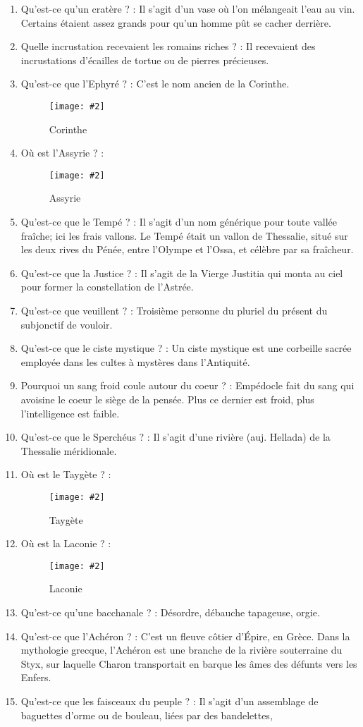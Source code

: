 \documentclass[a4paper, 11pt, hidelinks]{article}
\newcommand{\img}[4]{\begin{figure}[!ht]
    \centering
    \texttt{[image: \#2]}
    \caption{#3}
    \label{#4}
    \end{figure} }
\begin{document}
\begin{enumerate}
      \item Qu'est-ce qu'un cratère ? : Il s'agit d'un vase où l'on mélangeait l'eau au vin. Certains étaient assez grands pour
            qu'un homme pût se cacher derrière.
      \item Quelle incrustation recevaient les romains riches ? : Il recevaient des incrustations d'écailles de tortue ou de pierres précieuses.
      \item Qu'est-ce que l'Ephyré ? : C'est le nom ancien de la Corinthe.
            \img{0.3}{Corinthe.png}{Corinthe}{101}
      \item Où est l'Assyrie ? :
            \img{0.3}{Assyrie.jpg}{Assyrie}{102}
      \item Qu'est-ce que le Tempé ? : Il s'agit d'un nom générique pour toute vallée fraîche; ici les frais vallons. Le Tempé était un vallon de Thessalie, situé
            sur les deux rives du Pénée, entre l'Olympe et l'Ossa, et célèbre par sa fraîcheur.
      \item Qu'est-ce que la Justice ? : Il s'agit de la Vierge Justitia qui monta au ciel pour former la constellation de l'Astrée.
      \item Qu'est-ce que veuillent ? : Troisième personne du pluriel du présent du subjonctif de vouloir.
      \item Qu'est-ce que le ciste mystique ? : Un ciste mystique est une corbeille sacrée employée dans les cultes à mystères dans l'Antiquité.
      \item Pourquoi un sang froid coule autour du coeur ? : Empédocle fait du sang qui avoisine le coeur le siège de la pensée.
            Plus ce dernier est froid, plus l'intelligence est faible.
      \item Qu'est-ce que le Sperchéus ? : Il s'agit d'une rivière (auj. Hellada) de la Thessalie méridionale.
      \item Où est le Taygète ? :
            \img{0.3}{Taygete.png}{Taygète}{103}
      \item Où est la Laconie ? :
            \img{0.45}{Laconie.png}{Laconie}{104}
      \item Qu'est-ce qu'une bacchanale ? : Désordre, débauche tapageuse, orgie.
      \item Qu'est-ce que l'Achéron ? : C'est un fleuve côtier d'Épire, en Grèce. Dans la mythologie grecque, l'Achéron est une branche de la rivière souterraine du Styx,
            sur laquelle Charon transportait en barque les âmes des défunts vers les Enfers.
      \item Qu'est-ce que les faisceaux du peuple ? : Il s'agit d'un assemblage de baguettes d'orme ou de bouleau, liées par des bandelettes,

\end{enumerate}
\end{document}
